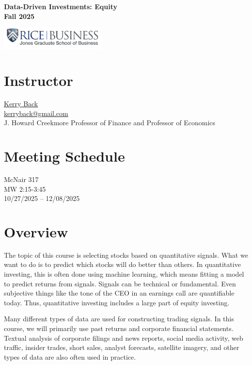 \documentclass[11pt]{article}
\begin{document}
\begin{center}
{\LARGE\textbf{Data-Driven Investments: Equity\\Fall 2025}}

\vspace{1em}

\includegraphics[width=0.4\textwidth]{RiceBusiness-transparent-logo-sm.png}
\end{center}

\vspace{1em}

\section{Instructor}

\href{https://kerryback.com}{Kerry Back}\\
\href{mailto:kerryback@gmail.com}{kerryback@gmail.com}\\
J. Howard Creekmore Professor of Finance and Professor of Economics

\section{Meeting Schedule}

McNair 317\\
MW 2:15-3:45\\
10/27/2025 -- 12/08/2025

\section{Overview}

The topic of this course is selecting stocks based on quantitative signals. What we want to do is to predict which stocks will do better than others. In quantitative investing, this is often done using machine learning, which means fitting a model to predict returns from signals. Signals can be technical or fundamental. Even subjective things like the tone of the CEO in an earnings call are quantifiable today. Thus, quantitative investing includes a large part of equity investing.

Many different types of data are used for constructing trading signals. In this course, we will primarily use past returns and corporate financial statements. Textual analysis of corporate filings and news reports, social media activity, web traffic, insider trades, short sales, analyst forecasts, satellite imagery, and other types of data are also often used in practice.
\end{document}

